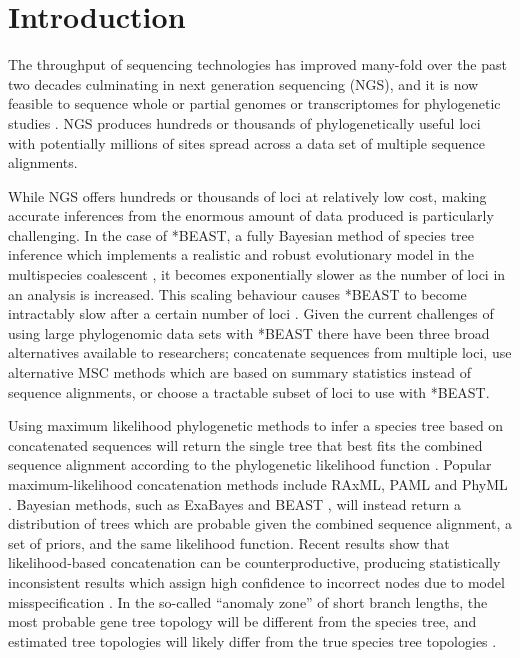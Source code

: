 \documentclass[nogrid]{MBE}%
\begin{document}

\maketitle
\clearpage

\section{Introduction}

The throughput of sequencing technologies has improved many-fold over the past
two decades culminating in next generation sequencing (NGS), and it is now
feasible to sequence whole or partial genomes or transcriptomes for phylogenetic
studies \citep{annurev-ecolsys-110512-135822}. NGS produces hundreds or
thousands of phylogenetically useful loci \citep[see for example][]{Blom20160181}
with potentially millions of sites spread across a data set of multiple
sequence alignments.

While NGS offers hundreds or thousands of loci at relatively low cost, making
accurate inferences from the enormous amount of data produced is particularly
challenging. In the case of *BEAST, a fully Bayesian method of species tree
inference which implements a realistic and robust evolutionary model in the
multispecies coalescent \citep[MSC;][]{Degnan2009332, Heled01032010}, it becomes exponentially
slower as the number of loci in an analysis is increased. This scaling behaviour
causes *BEAST to become intractably slow after a certain number of loci
\citep[the exact number will depend on other parameters of the data set, see][]{Ogilvie01052016}.
Given the current challenges of using large phylogenomic data sets with *BEAST
there have been three broad alternatives available to researchers; concatenate
sequences from multiple loci, use alternative MSC methods which are based on
summary statistics instead of sequence alignments, or choose a tractable
subset of loci to use with *BEAST.

Using maximum likelihood phylogenetic methods to infer a species tree based on concatenated
sequences will return the single tree that
best fits the combined sequence alignment according to the phylogenetic likelihood function \citep{Felsenstein1981}. Popular maximum-likelihood concatenation methods include
RAxML, PAML and PhyML \citep{Stamatakis01052014,
Yang01082007,Guindon01052010}. Bayesian methods, such as ExaBayes and BEAST
\citep{Aberer01102014, Drummond2007}, will instead return a distribution of trees which are probable
given the combined sequence alignment, a set of priors, and the same likelihood function.
Recent results show that likelihood-based concatenation
can be counterproductive, producing statistically inconsistent results which assign
high confidence to incorrect nodes due to model misspecification
\citep{NYAS:NYAS12747}. In the so-called ``anomaly zone'' of short branch
lengths, the most probable gene tree topology will be different from the species
tree, and estimated tree topologies will likely differ from the true species
tree topologies \citep{journal.pgen.0020068, Kubatko01022007}.
\end{document}
